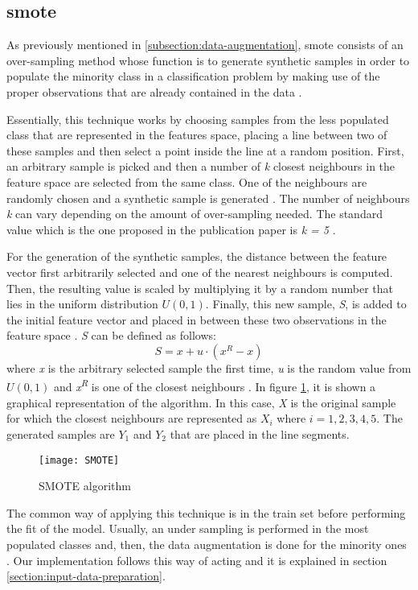 
\subsection{\acrfull{smote}}
\label{subsection:smote}

	As previously mentioned in \ref{subsection:data-augmentation}, \acrshort{smote} consists of an over-sampling method whose function is to generate synthetic samples in order to populate the minority class in a classification problem by making use of the proper observations that are already contained in the data \cite{Chawla2002}. 
	
	Essentially, this technique works by choosing samples from the less populated class that are represented in the features space, placing a line between two of these samples and then select a point inside the line at a random position. First, an arbitrary sample is picked and then a number of \textit{k} closest neighbours in the feature space are selected from the same class. One of the neighbours are randomly chosen and a synthetic sample is generated \cite{Browniee2020}. The number of neighbours \textit{k} can vary depending on the amount of over-sampling needed. The standard value which is the one proposed in the publication paper is \textit{k = 5} \cite{Chawla2002}. 
	
	For the generation of the synthetic samples, the distance between the feature vector first arbitrarily selected and one of the nearest neighbours is computed. Then, the resulting value is scaled by multiplying it by a random number that lies in the uniform distribution $U(0,1)$. Finally, this new sample, \textit{S}, is added to the initial feature vector and placed in between these two observations in the feature space \cite{Chawla2002}. \textit{S} can be defined as follows:
	\[S = x + u\cdot(x^{R} - x) \]
	where \textit{x} is the arbitrary selected sample the first time, \textit{u} is the random value from $U(0,1)$ and \textit{x\textsuperscript{R}} is one of the closest neighbours \cite{Blagus2013}. In figure \ref{fig:mesh47}, it is shown a graphical representation of the algorithm. In this case, \textit{X} is the original sample for which the closest neighbours are represented as $X_{i}$ where $i=1,2,3,4,5$. The generated samples are $Y_{1}$ and $Y_{2}$ that are placed in the line segments.
	
	\begin{figure}
		\centering
		\captionsetup{justification=centering}
		\texttt{[image: SMOTE]}
		\caption{SMOTE algorithm \cite{Xie2015}}
		\label{fig:mesh47}
	\end{figure}

	The common way of applying this technique is in the train set before performing the fit of the model. Usually, an under sampling is performed in the most populated classes and, then, the data augmentation is done for the minority ones \cite{Browniee2020}. Our implementation follows this way of acting and it is explained in section \ref{section:input-data-preparation}.
	
	 